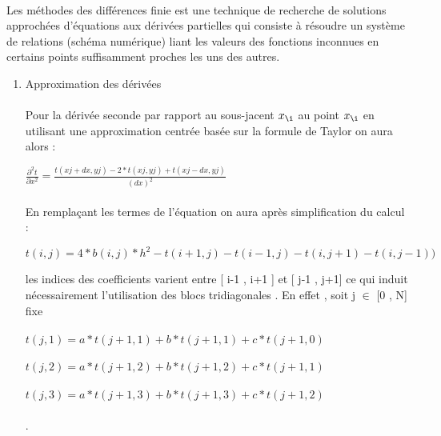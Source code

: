 \documentclass{article}
\begin{document}
    \paragraph{} 
    Les méthodes des différences finie est une technique de recherche de solutions approchées d’équations aux dérivées partielles qui consiste à résoudre un système de relations (schéma numérique) liant les valeurs des fonctions inconnues en certains points suffisamment proches les uns des autres. 
   \begin{enumerate}
   	\item { Approximation des dérivées }
   	\paragraph{}
   
 	Pour la dérivée seconde par rapport au sous-jacent $ x_{\i}$ au point $ x_{\i}$ en utilisant une approximation centrée basée sur la formule de Taylor  on aura alors : 
   	
   $	$$\frac{\partial^2 t}{\partial x^2}$$  = $$\frac{t( xj + dx , yj ) - 2*t( xj , yj ) + t( xj-dx , yj)}{(dx)^2 }$$ $ 
   
   \paragraph{}
   	En remplaçant les termes de l'équation %
   	on aura après simplification du calcul :
   	
   	$t ( i , j ) = 4 *b(i , j ) * h^2 - t(i+1 , j) - t(i-1 , j)-t(i , j+1)-t(i , j-1))$ 
   	
   	les indices des coefficients varient entre [ i-1 , i+1 ] et [ j-1 , j+1] 
   	ce qui induit nécessairement l'utilisation des blocs tridiagonales . En effet  , 
   	soit j $\in$ [0 , N] fixe 
   	\paragraph{}
   	$t(j,1) = a*t(j+1 , 1) + b*t(j+1,1) + c*t(j+1,0)$
   	\paragraph{}
    $t(j,2) = a*t(j+1 , 2) + b*t(j+1,2) + c*t(j+1,1)$
    \paragraph{}
    $t(j,3) = a*t(j+1 , 3) + b*t(j+1,3) + c*t(j+1,2)$ 
    \paragraph{}
    .

\end{enumerate}
\end{document}
